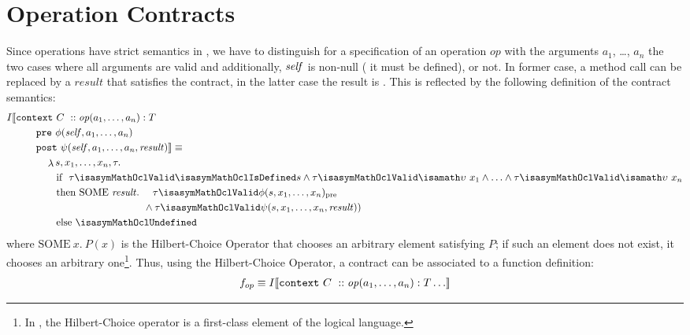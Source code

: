 \section{Operation Contracts}
Since operations have strict semantics in \OCL, we have to distinguish for a specification of an
operation $\mathit{op}$ with the arguments $a_1$, \ldots, $a_n$ the
two cases where all arguments are valid and additionally, $\mathit{self}$ is non-null (\ie{} it must be defined), or not. 
In former case, a method call can be replaced by a $\mathit{result}$
that satisfies the contract, in the latter case the result is
. This is reflected by the following definition of the contract semantics:
\begin{gather}\label{eq:contract}
\begin{aligned}
 I\semantics{& \mathtt{context}~C~:: \mathit{op}(a_1, \ldots, a_n) : T \\
                     & \qquad\mathtt{pre}~ \phi(\self, a_1, \ldots, a_n)  \\
                     & \qquad\mathtt{post}~\psi(\self, a_1, \ldots, a_n, \mathit{result})}  \equiv \\
 & \qquad \quad \lambda  s,  x_1, \ldots, x_n, \tau.  \\
 & \qquad\qquad \text{if}  ~ ~ \tau
\isasymMathOclValid \isasymMathOclIsDefined s \land \tau \isasymMathOclValid
\isasymupsilon~x_1 \land \ldots \land  \tau \isasymMathOclValid
\isasymupsilon~ x_n \\
 & \qquad\qquad \text{then} ~ \text{SOME}~ \mathit{result}. ~ ~ ~ ~\tau \isasymMathOclValid \phi(s, x_1, \ldots, x_n)_\text{pre} \\
 & \qquad\qquad\qquad\qquad\qquad\qquad ~ ~          \land \tau \isasymMathOclValid \psi(s, x_1, \ldots, x_n, \mathit{result}))\\
 &\qquad\qquad  \text{else}  ~  \isasymMathOclUndefined
\end{aligned}
\end{gather}
where $\text{SOME}~ x. ~P(x)$ is the Hilbert-Choice Operator that 
chooses an arbitrary element satisfying $P$; if such an element does not exist, it chooses
an arbitrary one\footnote{In \HOL, the Hilbert-Choice operator is a first-class element of
the logical language.}. Thus, using the Hilbert-Choice Operator, a contract can be associated
to a function definition:
\begin{gather}\label{eq:contractdef}
    f_{op}  \equiv I\llbracket  \mathtt{context}~C~:: \mathit{op}(a_1, \ldots, a_n) : T \ldots  \rrbracket
\end{gather}
